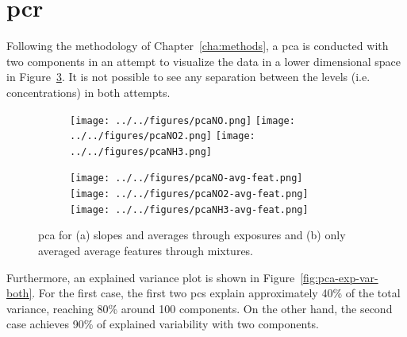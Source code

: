 \section{\acrlong{pcr}}
\label{sec:results-pcr}

Following the methodology of Chapter~\ref{cha:methods}, a \acrshort{pca} is conducted with two components in an attempt to visualize the data in a lower dimensional space in Figure~\ref{fig:pca-both}.  It is not possible to see any separation between the levels (i.e. concentrations) in both attempts.

\begin{figure}[!htb]
	\centering
	
	\begin{subfigure}[b]{1\textwidth}
	\texttt{[image: ../../figures/pcaNO.png]}
	\hfill
	\texttt{[image: ../../figures/pcaNO2.png]}
	\hfill
	\texttt{[image: ../../figures/pcaNH3.png]}
	\caption{}
	\label{fig:pca}
	\end{subfigure}
	
	\begin{subfigure}[b]{1\textwidth}
	\texttt{[image: ../../figures/pcaNO-avg-feat.png]}
	\hfill
	\texttt{[image: ../../figures/pcaNO2-avg-feat.png]}
	\hfill
	\texttt{[image: ../../figures/pcaNH3-avg-feat.png]}
	\caption{}
	\label{fig:pca-avg-only}
	\end{subfigure}
	
	\caption{\acrshort{pca} for (a) slopes and averages through exposures and (b) only averaged average features through mixtures.}
	\label{fig:pca-both}
\end{figure}

Furthermore, an explained variance plot is shown in Figure~\ref{fig:pca-exp-var-both}. For the first case, the first two \acrshort{pc}s explain approximately 40\% of the total variance, reaching 80\% around 100 components. On the other hand, the second case achieves 90\% of explained variability with two components.

